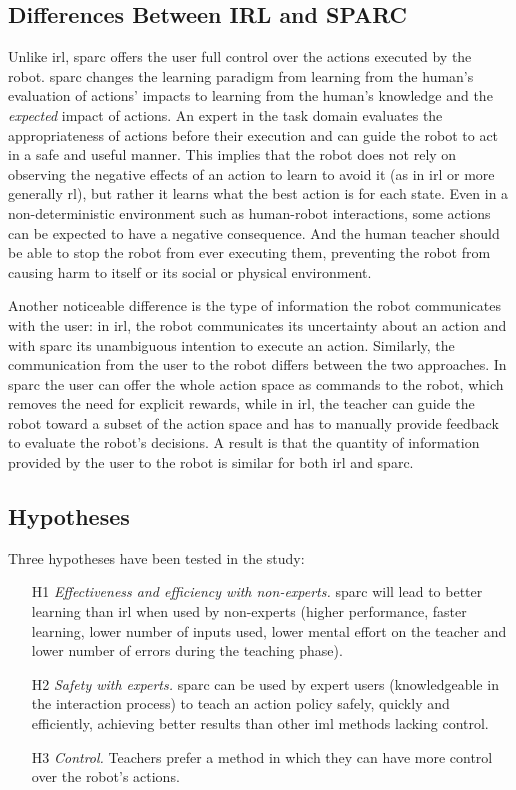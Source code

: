 \subsection{Differences Between IRL and SPARC}

Unlike \gls{irl}, \gls{sparc} offers the user full control over the actions executed by the robot. \gls{sparc} changes the learning paradigm from learning from the human's evaluation of actions' impacts to learning from the human's knowledge and the \emph{expected} impact of actions. An expert in the task domain evaluates the appropriateness of actions before their execution and can guide the robot to act in a safe and useful manner. This implies that the robot does not rely on observing the negative effects of an action to learn to avoid it (as in \gls{irl} or more generally \gls{rl}), but rather it learns what the best action is for each state. Even in a non-deterministic environment such as human-robot interactions, some actions can be expected to have a negative consequence. And the human teacher should be able to stop the robot from ever executing them, preventing the robot from causing harm to itself or its social or physical environment. 

Another noticeable difference is the type of information the robot communicates with the user: in \gls{irl}, the robot communicates its uncertainty about an action and with \gls{sparc} its unambiguous intention to execute an action. Similarly, the communication from the user to the  robot differs between the two approaches. In \gls{sparc} the user can offer the whole action space as commands to the robot, which removes the need for explicit rewards, while in \gls{irl}, the teacher can guide the robot toward a subset of the action space and has to manually provide feedback to evaluate the robot's decisions. A result is that the quantity of information provided by the user to the robot is similar for both \gls{irl} and \gls{sparc}. 

\subsection{Hypotheses}

Three hypotheses have been tested in the study:

\begin{enumerate}
	\item [H1] \textit{Effectiveness and efficiency with non-experts.} \gls{sparc} will lead to better learning than \gls{irl} when used by non-experts (higher performance, faster learning, lower number of inputs used, lower mental effort on the teacher and lower number of errors during the teaching phase). %
	\item [H2] \textit{Safety with experts.} \gls{sparc} can be used by expert users (knowledgeable in the interaction process) to teach an action policy safely, quickly and efficiently, achieving better results than other \gls{iml} methods lacking control.
	\item [H3] \textit{Control.} Teachers prefer a method in which they can have more control over the robot's actions.
\end{enumerate}
